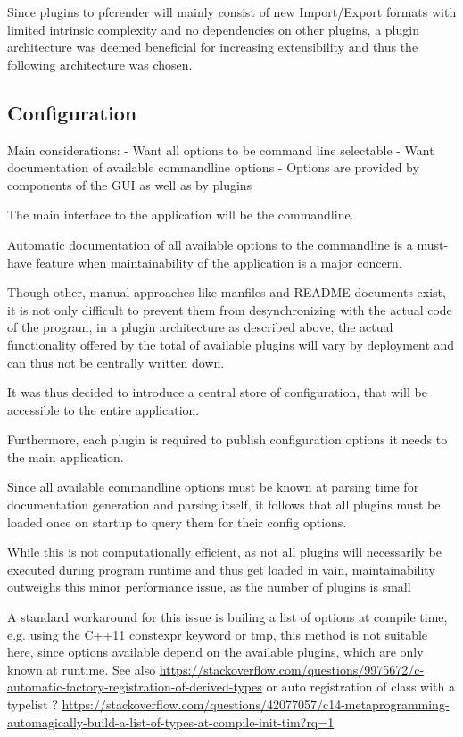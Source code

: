Since plugins to pfcrender will mainly consist of new Import/Export formats with limited intrinsic complexity and no dependencies on other plugins, a plugin architecture was deemed beneficial for increasing extensibility and thus the following architecture was chosen.


\subsection{Configuration}
Main considerations:
- Want all options to be command line selectable
- Want documentation of available commandline options
- Options are provided by components of the GUI as well as by plugins

The main interface to the application will be the commandline.

Automatic documentation of all available options to the commandline is a must-have feature when maintainability of the application is a major concern.

Though other, manual approaches like manfiles and README documents exist, it is not only difficult to prevent them from desynchronizing with the actual code of the program, in a plugin architecture as described above, the actual functionality offered by the total of available plugins will vary by deployment and can thus not be centrally written down.

It was thus decided to introduce a central store of configuration, that will be accessible to the entire application.

Furthermore, each plugin is required to publish configuration options it needs to the main application.

Since all available commandline options must be known at parsing time for documentation generation and parsing itself, it follows that all plugins must be loaded once on startup to query them for their config options.

While this is not computationally efficient, as not all plugins will necessarily be executed during program runtime and thus get loaded in vain, maintainability outweighs this minor performance issue, as the number of plugins is small


A standard workaround for this issue is builing a list of options at compile time, e.g. using the C++11 constexpr keyword or \gls{tmp}, this method is not suitable here, since options available depend on the available plugins, which are only known at runtime.
See also \url{https://stackoverflow.com/questions/9975672/c-automatic-factory-registration-of-derived-types}
or auto registration of class with a typelist ?
\url{https://stackoverflow.com/questions/42077057/c14-metaprogramming-automagically-build-a-list-of-types-at-compile-init-tim?rq=1}

